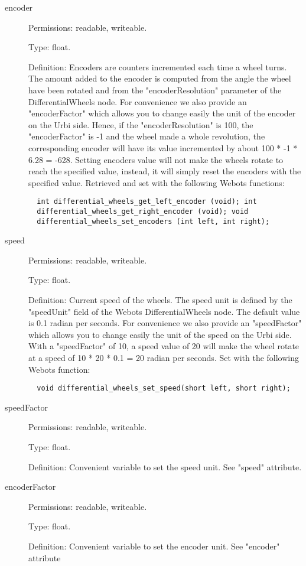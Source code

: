 \noindent
\begin{description}
\item[{encoder}] Permissions: readable, writeable.


  Type: float.


  Definition: Encoders are counters incremented each time a wheel
  turns. The amount added to the encoder is computed from the angle
  the wheel have been rotated and from the "encoderResolution"
  parameter of the DifferentialWheels node. For convenience we also
  provide an "encoderFactor" which allows you to change easily the
  unit of the encoder on the Urbi side.  Hence, if the
  "encoderResolution" is 100, the "encoderFactor" is -{}1 and the
  wheel made a whole revolution, the corresponding encoder will have
  its value incremented by about 100 * -{}1 * 6.28 = -{}628.  Setting
  encoders value will not make the wheels rotate to reach the
  specified value, instead, it will simply reset the encoders with the
  specified value.  Retrieved and set with the following Webots
  functions:


\begin{lstlisting}
  int differential_wheels_get_left_encoder (void); int
  differential_wheels_get_right_encoder (void); void
  differential_wheels_set_encoders (int left, int right);
\end{lstlisting}
\item[{speed}] Permissions: readable, writeable.


  Type: float.


  Definition: Current speed of the wheels. The speed unit is defined
  by the "speedUnit" field of the Webots DifferentialWheels node. The
  default value is 0.1 radian per seconds. For convenience we also
  provide an "speedFactor" which allows you to change easily the unit
  of the speed on the Urbi side.  With a "speedFactor" of 10, a speed
  value of 20 will make the wheel rotate at a speed of 10 * 20 * 0.1 =
  20 radian per seconds.  Set with the following Webots function:


\begin{lstlisting}
  void differential_wheels_set_speed(short left, short right);
\end{lstlisting}
\item[{speedFactor}] Permissions: readable, writeable.


  Type: float.


  Definition: Convenient variable to set the speed unit. See "speed"
  attribute.

\item[{encoderFactor}] Permissions: readable, writeable.


  Type: float.


  Definition: Convenient variable to set the encoder unit. See
  "encoder" attribute

\end{description}

